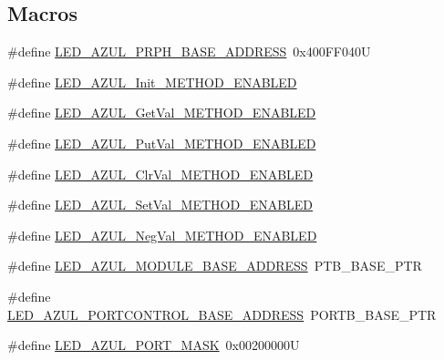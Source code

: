 \subsection*{Macros}
\begin{DoxyCompactItemize}
\item 
\#define \hyperlink{group___l_e_d___a_z_u_l__module_ga7d8f13cb339eab05df5c49fb6965562a}{L\+E\+D\+\_\+\+A\+Z\+U\+L\+\_\+\+P\+R\+P\+H\+\_\+\+B\+A\+S\+E\+\_\+\+A\+D\+D\+R\+E\+SS}~0x400\+F\+F040U
\item 
\#define \hyperlink{group___l_e_d___a_z_u_l__module_gae3985ba44a42fd929ca9b53cefa2cef2}{L\+E\+D\+\_\+\+A\+Z\+U\+L\+\_\+\+Init\+\_\+\+M\+E\+T\+H\+O\+D\+\_\+\+E\+N\+A\+B\+L\+ED}
\item 
\#define \hyperlink{group___l_e_d___a_z_u_l__module_ga6db5b0b5a40fc42b77c4df9327e206b4}{L\+E\+D\+\_\+\+A\+Z\+U\+L\+\_\+\+Get\+Val\+\_\+\+M\+E\+T\+H\+O\+D\+\_\+\+E\+N\+A\+B\+L\+ED}
\item 
\#define \hyperlink{group___l_e_d___a_z_u_l__module_ga29cc2c89697ced54804a37cdc39e7109}{L\+E\+D\+\_\+\+A\+Z\+U\+L\+\_\+\+Put\+Val\+\_\+\+M\+E\+T\+H\+O\+D\+\_\+\+E\+N\+A\+B\+L\+ED}
\item 
\#define \hyperlink{group___l_e_d___a_z_u_l__module_gaef1a8623908ea1d191f972cad5a6eb87}{L\+E\+D\+\_\+\+A\+Z\+U\+L\+\_\+\+Clr\+Val\+\_\+\+M\+E\+T\+H\+O\+D\+\_\+\+E\+N\+A\+B\+L\+ED}
\item 
\#define \hyperlink{group___l_e_d___a_z_u_l__module_ga177509261b014bc4722f28205377d856}{L\+E\+D\+\_\+\+A\+Z\+U\+L\+\_\+\+Set\+Val\+\_\+\+M\+E\+T\+H\+O\+D\+\_\+\+E\+N\+A\+B\+L\+ED}
\item 
\#define \hyperlink{group___l_e_d___a_z_u_l__module_ga11a5c402a601c0af4a49c97e4de8506d}{L\+E\+D\+\_\+\+A\+Z\+U\+L\+\_\+\+Neg\+Val\+\_\+\+M\+E\+T\+H\+O\+D\+\_\+\+E\+N\+A\+B\+L\+ED}
\item 
\#define \hyperlink{group___l_e_d___a_z_u_l__module_gaaaba183aa00d94ee298b32c77183cd61}{L\+E\+D\+\_\+\+A\+Z\+U\+L\+\_\+\+M\+O\+D\+U\+L\+E\+\_\+\+B\+A\+S\+E\+\_\+\+A\+D\+D\+R\+E\+SS}~P\+T\+B\+\_\+\+B\+A\+S\+E\+\_\+\+P\+TR
\item 
\#define \hyperlink{group___l_e_d___a_z_u_l__module_ga2383071b38065a5e66b896473172bd23}{L\+E\+D\+\_\+\+A\+Z\+U\+L\+\_\+\+P\+O\+R\+T\+C\+O\+N\+T\+R\+O\+L\+\_\+\+B\+A\+S\+E\+\_\+\+A\+D\+D\+R\+E\+SS}~P\+O\+R\+T\+B\+\_\+\+B\+A\+S\+E\+\_\+\+P\+TR
\item 
\#define \hyperlink{group___l_e_d___a_z_u_l__module_ga46c5ac529950e940484ca896a4abdeea}{L\+E\+D\+\_\+\+A\+Z\+U\+L\+\_\+\+P\+O\+R\+T\+\_\+\+M\+A\+SK}~0x00200000U
\end{DoxyCompactItemize}
